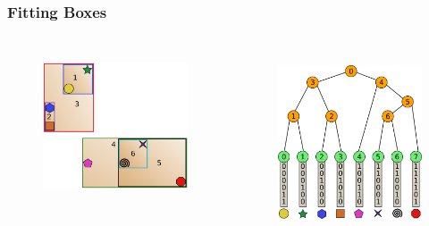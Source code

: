 \documentclass{beamer}
\begin{document}
\begin{frame}
  \frametitle{Fitting Boxes}
  
\begin{columns}[t]

\begin{figure}
\includegraphics[height=45mm]{fit_3.png}
\end{figure}

\begin{figure}
\includegraphics[height=55mm]{radix_tree_bare.png}
\end{figure}
\end{columns}
\end{frame}
\end{document}

